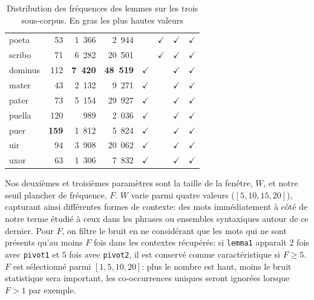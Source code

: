 \begin{table}[p]
\begin{tabular}{l|rrr|rrrr}
poeta    &                  53 &            1~366 &      2~944 &         &           $\checkmark$ &                   $\checkmark$ &                        $\checkmark$ \\
scribo   &                  71 &            6~282 &     20~501 &         &           $\checkmark$ &                   $\checkmark$ &                        $\checkmark$ \\
dominus  &                 112 &            \textbf{7~420} &     \textbf{48~519} &         $\checkmark$ &           &                   $\checkmark$ &                        $\checkmark$ \\
mater    &                  43 &            2~132 &      9~271 &         $\checkmark$ &           &                   $\checkmark$ &                        $\checkmark$ \\
pater    &                  73 &            5~154 &     29~927 &         $\checkmark$ &           &                   $\checkmark$ &                        $\checkmark$ \\
puella   &                 120 &             989 &      2~036 &         $\checkmark$ &           &                   $\checkmark$ &                        $\checkmark$ \\
puer     &                 \textbf{159} &            1~812 &      5~824 &         $\checkmark$ &           &                   $\checkmark$ &                        $\checkmark$ \\
uir      &                  94 &            3~908 &     20~062 &         $\checkmark$ &           &                   $\checkmark$ &                        $\checkmark$ \\
uxor     &                  63 &            1~306 &      7~832 &         $\checkmark$ &           &                   $\checkmark$ &                        $\checkmark$ \\
    \bottomrule
    \end{tabular}

    \caption{Distribution des fréquences des lemmes sur les trois sous-corpus. En gras les plus hautes valeurs}
    \label{tab:chap1:noise:freq_corpora}
\end{table}


Nos deuxièmes et troisièmes paramètres sont la taille de la fenêtre, $W$, et notre seuil plancher de fréquence, $F$. $W$ varie parmi quatre valeurs ($\left [ 5, 10, 15, 20 \right ]$), capturant ainsi différentes formes de contexte: des mots immédiatement à côté de notre terme étudié à ceux dans les phrases ou ensembles syntaxiques autour de ce dernier. Pour $F$, on filtre le bruit en ne considérant que les mots qui ne sont présents qu'au moins $F$ fois dans les contextes récupérés: si \texttt{lemma1} apparaît $2$ fois avec \texttt{pivot1} et $5$ fois avec \texttt{pivot2}, il est conservé comme caractéristique si $F\geq5$. $F$ est sélectionné parmi $\left [ 1, 5, 10, 20 \right ]$: plus le nombre est haut, moins le bruit statistique sera important, les co-occurrences uniques seront ignorées lorsque $F > 1$ par exemple.


